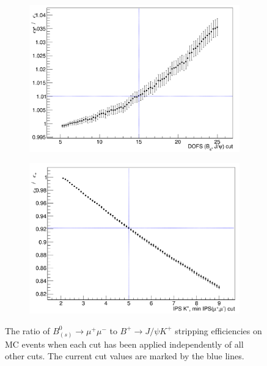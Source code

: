 \begin{figure}
    \begin{subfigure}[b]{0.4\textwidth}
        \includegraphics[width=\textwidth]{./Figs/Selection/DOFS.png}
        \caption{ }
        \label{fig:FD_ratio}
    \end{subfigure}
   \begin{subfigure}[b]{0.4\textwidth}
        \includegraphics[width=\textwidth]{./Figs/Selection/daug_IPS.png}
        \caption{ }
        \label{fig:IPS_ratio}
    \end{subfigure}
    \caption{The ratio of $B^{0}_{(s)}\to\mu^{+} \mu^{-}$ to $B^{+}\to J/\psi K^{+}$ stripping efficiencies on MC events when each cut has been applied independently of all other cuts. The current cut values are marked by the blue lines.}
    \label{fig:ratio_plots}
\end{figure}



